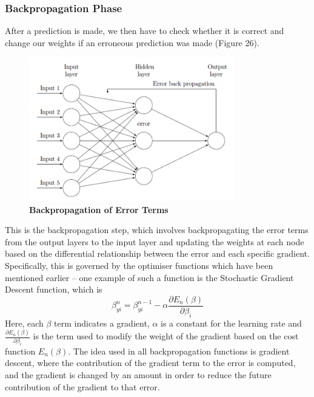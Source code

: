 \documentclass{article}
\begin{document}
\subsubsection{Backpropagation Phase}
After a prediction is made, we then have to check whether it is correct and change our weights if an erroneous prediction was made (Figure 26).
\begin{figure}[H]
\centering
\includegraphics[width=0.8\textwidth]{backpropagation.png}
\caption{\textbf{Backpropagation of Error Terms}}
\end{figure}
This is the backpropagation step, which involves backpropagating the error terms from the output layers to the input layer and updating the weights at each node based on the differential relationship between the error and each specific gradient. Specifically, this is governed by the optimiser functions which have been mentioned earlier -- one example of such a function is the Stochastic Gradient Descent function, which is 
\begin{equation}
\beta^n_{yi} = \beta^{n-1}_{yi} - \alpha \frac{\partial{E_n}(\beta)}{\partial{\beta_i}}
\end{equation}
Here, each $\beta$ term indicates a gradient, $\alpha$ is a constant for the learning rate and $\frac{\partial{E_n}(\beta)}{\partial{\beta_i}}$ is the term used to modify the weight of the gradient based on the cost function ${E_n}(\beta)$. The idea used in all backpropagation functions is gradient descent, where the contribution of the gradient term to the error is computed, and the gradient is changed by an amount in order to reduce the future contribution of the gradient to that error. 
\end{document}
